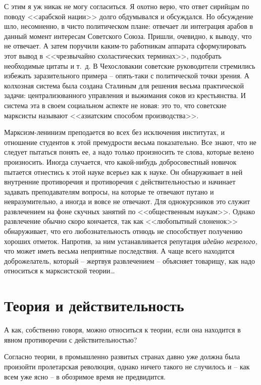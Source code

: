 \documentclass{book}
\begin{document}
С этим я уж никак не могу согласиться. Я охотно верю, что ответ сирийцам по поводу <<арабской нации>> долго обду­мывался и 
обсуждался. Но обсуждение шло, несомненно, в чи­сто политическом плане: отвечает ли интеграция арабов в дан­ный момент интересам 
Советского Союза. Пришли, очевидно, к выводу, что не отвечает. А затем поручили каким-то работ­никам аппарата сформулировать этот 
вывод в <<чрезвычайно схоластических терминах>>, подобрать необходимые цитаты и т.~д. В Чехословакии советские руководители 
стремились из­бежать заразительного примера -- опять-таки с политической точки зрения. А колхозная система была создана Сталиным 
для решения весьма практической задачи: централизованного управления и выжимания соков из крестьянства. И система эта в своем 
социальном аспекте не новая: это то, что совет­ские марксисты называют <<азиатским способом производства>>.

Марксизм-ленинизм преподается во всех без исключения институтах, и отношение студентов к этой премудрости весь­ма показательно. Все знают, что не следует пытаться понять ее, а надо только произносить те слова, которые велено произ­носить. Иногда случается, что какой-нибудь добросовестный новичок пытается отнестись к этой науке всерьез как к науке. Он обнаруживает в ней внутренние противоречия и противо­речия с действительностью и начинает задавать преподавате­лям вопросы, на которые те отвечают путано и невразумитель­но, а иногда и вовсе не отвечают. Для однокурсников это слу­жит развлечением на фоне скучных занятий по <<общественным наукам>>. Однако развлечение обычно скоро кончается, так как <<любопытный слоненок>> обнаруживает, что его любозна­тельность отнюдь не способствует получению хороших отметок. Напротив, за ним устанавливается репутация \textit{идейно незрелого,} что может иметь весьма неприятные последствия. А чаще всего находится доброжелатель, который -- жертвуя развлечением -- объясняет товарищу, 
как надо относиться к марксистской теории\ldots


\section{Теория и действительность}

А как, собственно говоря, можно относиться к теории, если она находится в явном противоречии с действительностью?

Согласно теории, в промышленно развитых странах давно уже должна была произойти пролетарская революция, однако ничего такого не 
случилось и -- как всем уже ясно -- в обозримое время не предвидится.
\end{document}
